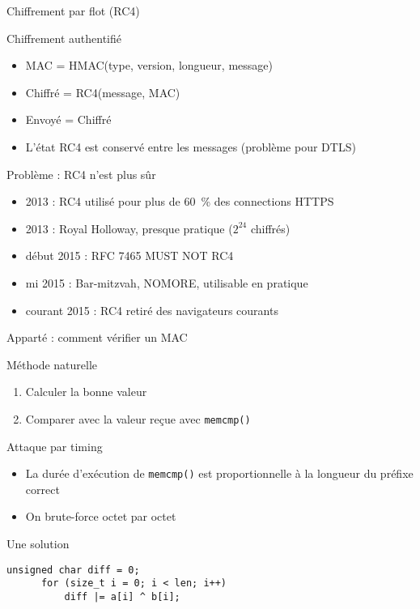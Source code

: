 \documentclass{mpg-ep-slides}
\begin{document}
\begin{frame}{Chiffrement par flot (RC4)}
  \begin{block}{Chiffrement authentifié}
    \begin{itemize}
      \item MAC = HMAC(type, version, longueur, message)
      \item Chiffré = RC4(message, MAC)
      \item Envoyé = Chiffré
      \item L'état RC4 est conservé entre les messages (problème pour DTLS)
    \end{itemize}
  \end{block}

  \begin{block}{Problème : RC4 n'est plus sûr}
    \begin{itemize}
      \item 2013 : RC4 utilisé pour plus de 60~\% des connections HTTPS
      \item 2013 : Royal Holloway, presque pratique ($2^{24}$ chiffrés)
      \item début 2015 : RFC 7465 MUST NOT RC4
      \item mi 2015 : Bar-mitzvah, NOMORE, utilisable en pratique
      \item courant 2015 : RC4 retiré des navigateurs courants
    \end{itemize}
  \end{block}
\end{frame}

\begin{frame}[containsverbatim]{Apparté : comment vérifier un MAC}
  \begin{block}{Méthode naturelle}
    \begin{enumerate}
      \item Calculer la bonne valeur
      \item Comparer avec la valeur reçue avec \texttt{memcmp()}
    \end{enumerate}
  \end{block}

  \begin{block}{Attaque par timing}
    \begin{itemize}
      \item La durée d'exécution de \texttt{memcmp()} est proportionnelle à la
        longueur du préfixe correct
      \item On brute-force octet par octet
    \end{itemize}
  \end{block}

  \begin{block}{Une solution}
    \begin{Verbatim}[gobble=4]
      unsigned char diff = 0;
      for (size_t i = 0; i < len; i++)
          diff |= a[i] ^ b[i];
    \end{Verbatim}
  \end{block}
\end{frame}
\end{document}
